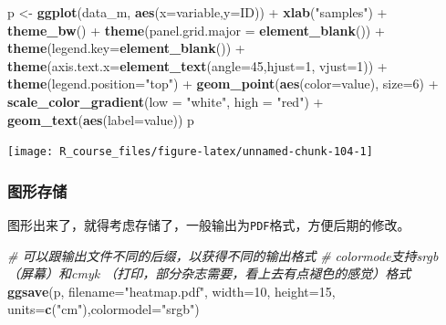 \documentclass[]{article}
\newenvironment{Shaded}{\begin{snugshade}}{\end{snugshade}}
\newcommand{\KeywordTok}[1]{\textcolor[rgb]{0.13,0.29,0.53}{\textbf{{#1}}}}
\newcommand{\DataTypeTok}[1]{\textcolor[rgb]{0.13,0.29,0.53}{{#1}}}
\newcommand{\DecValTok}[1]{\textcolor[rgb]{0.00,0.00,0.81}{{#1}}}
\newcommand{\StringTok}[1]{\textcolor[rgb]{0.31,0.60,0.02}{{#1}}}
\newcommand{\CommentTok}[1]{\textcolor[rgb]{0.56,0.35,0.01}{\textit{{#1}}}}
\newcommand{\NormalTok}[1]{{#1}}
\numberwithin{figure}{section}
\numberwithin{table}{section}
\theoremstyle{definition}
\theoremstyle{definition}
\theoremstyle{definition}
\theoremstyle{remark}
\begin{document}
\begin{Shaded}
\begin{Highlighting}[]
\NormalTok{p <-}\StringTok{ }\KeywordTok{ggplot}\NormalTok{(data_m, }\KeywordTok{aes}\NormalTok{(}\DataTypeTok{x=}\NormalTok{variable,}\DataTypeTok{y=}\NormalTok{ID)) +}\StringTok{ }\KeywordTok{xlab}\NormalTok{(}\StringTok{"samples"}\NormalTok{) +}\StringTok{ }\KeywordTok{theme_bw}\NormalTok{() +}\StringTok{ }
\StringTok{    }\KeywordTok{theme}\NormalTok{(}\DataTypeTok{panel.grid.major =} \KeywordTok{element_blank}\NormalTok{()) +}\StringTok{ }\KeywordTok{theme}\NormalTok{(}\DataTypeTok{legend.key=}\KeywordTok{element_blank}\NormalTok{()) +}\StringTok{ }
\StringTok{    }\KeywordTok{theme}\NormalTok{(}\DataTypeTok{axis.text.x=}\KeywordTok{element_text}\NormalTok{(}\DataTypeTok{angle=}\DecValTok{45}\NormalTok{,}\DataTypeTok{hjust=}\DecValTok{1}\NormalTok{, }\DataTypeTok{vjust=}\DecValTok{1}\NormalTok{)) +}\StringTok{ }
\StringTok{    }\KeywordTok{theme}\NormalTok{(}\DataTypeTok{legend.position=}\StringTok{"top"}\NormalTok{) +}\StringTok{      }
\StringTok{  }\KeywordTok{geom_point}\NormalTok{(}\KeywordTok{aes}\NormalTok{(}\DataTypeTok{color=}\NormalTok{value), }\DataTypeTok{size=}\DecValTok{6}\NormalTok{) +}
\StringTok{  }\KeywordTok{scale_color_gradient}\NormalTok{(}\DataTypeTok{low =} \StringTok{"white"}\NormalTok{, }\DataTypeTok{high =} \StringTok{"red"}\NormalTok{) +}
\StringTok{  }\KeywordTok{geom_text}\NormalTok{(}\KeywordTok{aes}\NormalTok{(}\DataTypeTok{label=}\NormalTok{value))}
\NormalTok{p}
\end{Highlighting}
\end{Shaded}

\begin{center}\texttt{[image: R\_course\_files/figure-latex/unnamed-chunk-104-1]} \end{center}

\subsubsection{图形存储}

图形出来了，就得考虑存储了，一般输出为\texttt{PDF}格式，方便后期的修改。

\begin{Shaded}
\begin{Highlighting}[]
\CommentTok{# 可以跟输出文件不同的后缀，以获得不同的输出格式}
\CommentTok{# colormode支持srgb （屏幕）和cmyk （打印，部分杂志需要，看上去有点褪色的感觉）格式}
\KeywordTok{ggsave}\NormalTok{(p, }\DataTypeTok{filename=}\StringTok{"heatmap.pdf"}\NormalTok{, }\DataTypeTok{width=}\DecValTok{10}\NormalTok{,}
        \DataTypeTok{height=}\DecValTok{15}\NormalTok{, }\DataTypeTok{units=}\KeywordTok{c}\NormalTok{(}\StringTok{"cm"}\NormalTok{),}\DataTypeTok{colormodel=}\StringTok{"srgb"}\NormalTok{)}
\end{Highlighting}
\end{Shaded}
\end{document}
